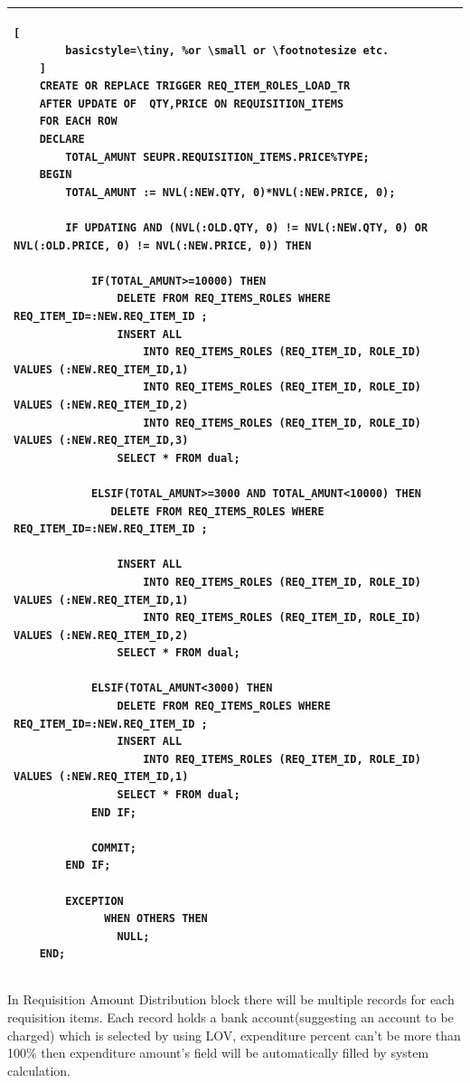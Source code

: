 \documentclass[12pt]{report} %
\begin{document}
\begin{table}

	\begin{tabular}{|l|}
	\hline
	\begin{lstlisting}[
	    basicstyle=\tiny, %or \small or \footnotesize etc.
	]
	CREATE OR REPLACE TRIGGER REQ_ITEM_ROLES_LOAD_TR
	AFTER UPDATE OF  QTY,PRICE ON REQUISITION_ITEMS  
	FOR EACH ROW
	DECLARE
	    TOTAL_AMUNT SEUPR.REQUISITION_ITEMS.PRICE%TYPE;
	BEGIN
	    TOTAL_AMUNT := NVL(:NEW.QTY, 0)*NVL(:NEW.PRICE, 0);

	    IF UPDATING AND (NVL(:OLD.QTY, 0) != NVL(:NEW.QTY, 0) OR NVL(:OLD.PRICE, 0) != NVL(:NEW.PRICE, 0)) THEN

	        IF(TOTAL_AMUNT>=10000) THEN
	            DELETE FROM REQ_ITEMS_ROLES WHERE REQ_ITEM_ID=:NEW.REQ_ITEM_ID ;
	            INSERT ALL
	                INTO REQ_ITEMS_ROLES (REQ_ITEM_ID, ROLE_ID) VALUES (:NEW.REQ_ITEM_ID,1)
	                INTO REQ_ITEMS_ROLES (REQ_ITEM_ID, ROLE_ID) VALUES (:NEW.REQ_ITEM_ID,2)
	                INTO REQ_ITEMS_ROLES (REQ_ITEM_ID, ROLE_ID) VALUES (:NEW.REQ_ITEM_ID,3)
	            SELECT * FROM dual;

	        ELSIF(TOTAL_AMUNT>=3000 AND TOTAL_AMUNT<10000) THEN
	           DELETE FROM REQ_ITEMS_ROLES WHERE REQ_ITEM_ID=:NEW.REQ_ITEM_ID ;

	            INSERT ALL
	                INTO REQ_ITEMS_ROLES (REQ_ITEM_ID, ROLE_ID) VALUES (:NEW.REQ_ITEM_ID,1)
	                INTO REQ_ITEMS_ROLES (REQ_ITEM_ID, ROLE_ID) VALUES (:NEW.REQ_ITEM_ID,2)
	            SELECT * FROM dual;

	        ELSIF(TOTAL_AMUNT<3000) THEN
	            DELETE FROM REQ_ITEMS_ROLES WHERE REQ_ITEM_ID=:NEW.REQ_ITEM_ID ;
	            INSERT ALL
	                INTO REQ_ITEMS_ROLES (REQ_ITEM_ID, ROLE_ID) VALUES (:NEW.REQ_ITEM_ID,1)
	            SELECT * FROM dual;
	        END IF;

	        COMMIT;
	    END IF;

	    EXCEPTION
	          WHEN OTHERS THEN
	            NULL;
	END;
	\end{lstlisting}\\
	\hline
	\end{tabular}
\end{table}


In Requisition Amount Distribution block there will be multiple records for each requisition items. Each record holds a bank account(suggesting an account to be charged) which is selected by using LOV, expenditure percent can't be more than 100\% then expenditure amount's field will be automatically filled by system calculation.\\
\end{document}

